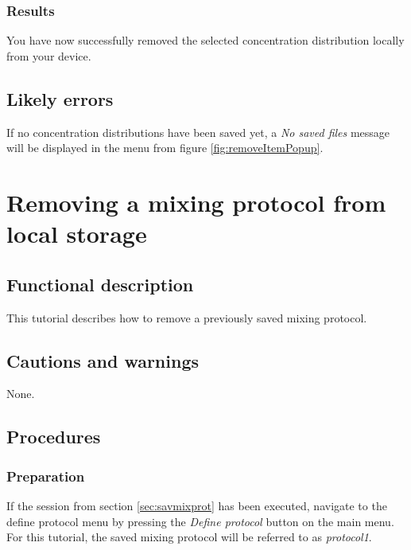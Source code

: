 \subsubsection{Results}
You have now successfully removed the selected concentration distribution locally from your device.

\subsection{Likely errors}
If no concentration distributions have been saved yet, a \emph{No saved files} message will be displayed in the menu from figure \ref{fig:removeItemPopup}.

\section{Removing a mixing protocol from local storage}\label{sec:remmixprot}

\subsection{Functional description}
This tutorial describes how to remove a previously saved mixing protocol.

\subsection{Cautions and warnings}
None.

\subsection{Procedures}

\subsubsection{Preparation}
If the session from section \ref{sec:savmixprot} has been executed, navigate to the define protocol menu by pressing the \emph{Define protocol} button on the main menu.
For this tutorial, the saved mixing protocol will be referred to as \emph{protocol1}.

